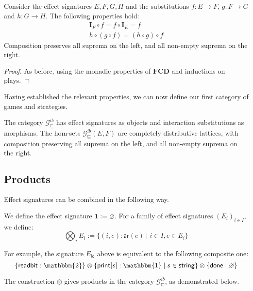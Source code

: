 \documentclass[format=sigplan,authordraft]{acmart}
\newcommand{\gcat}{\mathcal{G}_{\sqsubseteq}}
\newcommand{\kw}[1]{\ensuremath{ \mathsf{#1} }}
\begin{document}
\begin{lemma}
Consider the effect signatures $E, F, G, H$ and
the substitutions
$f : E \rightarrow F$,
$g : F \rightarrow G$ and
$h : G \rightarrow H$.
The following properties hold:
\begin{gather*}
  \mathbf{I}_F \circ f = f \circ \mathbf{I}_E = f \\
  h \circ (g \circ f) = (h \circ g) \circ f
\end{gather*}
Composition preserves all suprema on the left,
and all non-empty suprema on the right.
\begin{proof}
As before,
using the monadic properties of $\mathbf{FCD}$
and inductions on plays.
\end{proof}
\end{lemma}

Having established the relevant properties,
we can now define our first category of games and strategies.

\begin{definition}
The category $\gcat^{ib}$ has effect signatures as objects
and interaction substitutions as morphisms.
The hom-sets $\gcat^{ib}(E, F)$
are completely distributive lattices,
with composition preserving all suprema on the left,
and all non-empty suprema on the right.
\end{definition}


\subsection{Products} %

Effect signatures can be combined in the following way.

\begin{definition}
We define the effect signature
$\mathbf{1} := \varnothing$.
For a family of effect signatures $(E_i)_{i \in I}$,
we define:
\[
  \bigotimes_i E_i := \{ (i, e) : \kw{ar}(e) \mid i \in I, e \in E_i \}
\]
\end{definition}

For example,
the signature $E_\kw{io}$ above is equivalent
to the following composite one:
\[
    \{ \kw{readbit} : \mathbbm{2} \} \otimes
    \{ \kw{print}[s] : \mathbbm{1} \mid s \in \kw{string} \} \otimes
    \{ \kw{done} : \varnothing \}
\]

The construction $\otimes$ gives products in the category $\gcat^{ib}$,
as demonstrated below.
\end{document}
